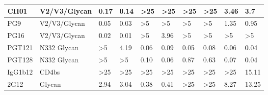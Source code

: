 \begin{table*}[h!]
{\begin{tabular}{l|l|l|l|l|l|l|l|l|l|}
			\multicolumn{1}{|l|}{CH01}    & V2/V3/Glycan  & 0.17                         & 0.14                         & \textgreater{}25               & \textgreater{}25               & \textgreater{}25               & \textgreater{}25                         & \cellcolor[HTML]{C0C0C0}3.46  & \cellcolor[HTML]{C0C0C0}3.7              \\ \hline
			\multicolumn{1}{|l|}{PG9}     & V2/V3/Glycan  & 0.05                         & 0.03                         & \textgreater{}5                & \textgreater{}5                & \textgreater{}5                & \textgreater{}5                          & 1.35                          & 0.95                                     \\ \hline
			\multicolumn{1}{|l|}{PG16}    & V2/V3/Glycan  & 0.02                         & 0.01                         & \textgreater{}5                & 3.96                           & \textgreater{}5                & \textgreater{}5                          & \textgreater{}5               & \textgreater{}5                          \\ \hline
			\multicolumn{1}{|l|}{PGT121}  & N332 Glycan   & \textgreater{}5              & 4.19                         & 0.06                           & 0.09                           & 0.05                           & 0.08                                     & 0.06                          & 0.04                                     \\ \hline
			\multicolumn{1}{|l|}{PGT128}  & N332 Glycan   & \textgreater{}5              & \textgreater{}5              & 0.10                           & 0.06                           & 0.87                           & 0.63                                     & 0.07                          & 0.04                                     \\ \hline
			\multicolumn{1}{|l|}{IgG1b12} & CD4bs         & \textgreater{}25             & \textgreater{}25             & \textgreater{}25               & \textgreater{}25               & \textgreater{}25               & \textgreater{}25                         & \textgreater{}25              & 15.11                                    \\ \hline
			\multicolumn{1}{|l|}{2G12}    & Glycan        & \cellcolor[HTML]{C0C0C0}2.94 & \cellcolor[HTML]{C0C0C0}3.04 & 0.38                           & 0.41                           & \textgreater{}25               & \textgreater{}25                         & \cellcolor[HTML]{C0C0C0}8.27  & \cellcolor[HTML]{C0C0C0}13.25            \\ \hline

\end{tabular}}
\end{table*}
